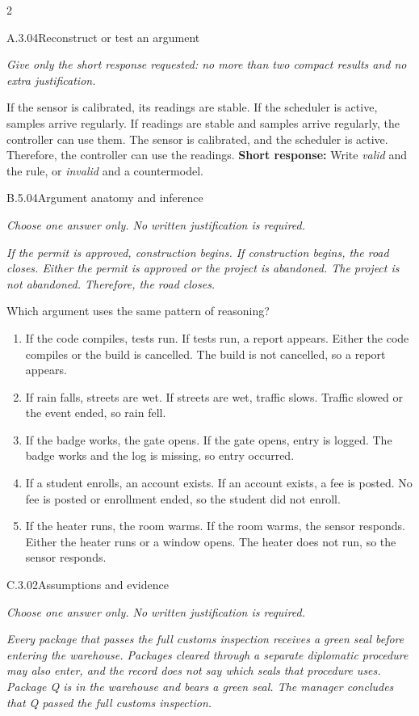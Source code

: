 \documentclass[9pt]{extarticle}
\newcommand{\choice}[1]{\item #1}
\begin{document}
\begin{multicols}{2}
\begin{DenseCoreProblem}{A.3.04}{Reconstruct or test an argument}
{\scriptsize\textit{Give only the short response requested: no more than two compact results and no extra justification.}\par}
If the sensor is calibrated, its readings are stable. If the scheduler is active, samples arrive regularly. If readings are stable and samples arrive regularly, the controller can use them. The sensor is calibrated, and the scheduler is active. Therefore, the controller can use the readings.
\textbf{Short response:} Write \emph{valid} and the rule, or \emph{invalid} and a countermodel.
\end{DenseCoreProblem}
\begin{DenseCoreProblem}{B.5.04}{Argument anatomy and inference}
{\scriptsize\textit{Choose one answer only. No written justification is required.}\par}
\emph{If the permit is approved, construction begins. If construction begins, the road closes. Either the permit is approved or the project is abandoned. The project is not abandoned. Therefore, the road closes.}

Which argument uses the same pattern of reasoning?
\begin{enumerate}[label=(\alph*)]
  \choice{If the code compiles, tests run. If tests run, a report appears. Either the code compiles or the build is cancelled. The build is not cancelled, so a report appears.}
  \choice{If rain falls, streets are wet. If streets are wet, traffic slows. Traffic slowed or the event ended, so rain fell.}
  \choice{If the badge works, the gate opens. If the gate opens, entry is logged. The badge works and the log is missing, so entry occurred.}
  \choice{If a student enrolls, an account exists. If an account exists, a fee is posted. No fee is posted or enrollment ended, so the student did not enroll.}
  \choice{If the heater runs, the room warms. If the room warms, the sensor responds. Either the heater runs or a window opens. The heater does not run, so the sensor responds.}
\end{enumerate}
\end{DenseCoreProblem}
\columnbreak
\begin{DenseCoreProblem}{C.3.02}{Assumptions and evidence}
{\scriptsize\textit{Choose one answer only. No written justification is required.}\par}
\emph{Every package that passes the full customs inspection receives a green seal before entering the warehouse. Packages cleared through a separate diplomatic procedure may also enter, and the record does not say which seals that procedure uses. Package Q is in the warehouse and bears a green seal. The manager concludes that Q passed the full customs inspection.}


\end{DenseCoreProblem}
\end{multicols}
\end{document}
